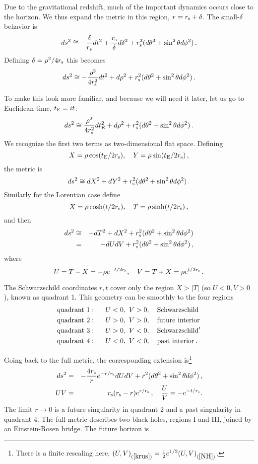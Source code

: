 \documentclass[12pt]{article}
\newcommand{\be}{\begin{equation}}
\newcommand{\ee}{\end{equation}}
\newcommand{\bea}{\begin{eqnarray}}
\newcommand{\eea}{\end{eqnarray}}
\newcommand{\rmx}{\rm}
\newcommand{\rs}{r_{\rmx s}}
\begin{document}
Due to the gravitational redshift, much of the important dynamics occurs close to the horizon.  We  thus expand the metric in this region, $r =  r_{\rmx s} + \delta$.
The small-$\delta$ behavior is
\be
ds^2 \cong - \frac{\delta}{ r_{\rmx s}} dt^2 + \frac{ r_{\rmx s}}{\delta} d\delta^2 +  r_{\rmx s}^2 (d\theta^2 + \sin^2\theta d\phi^2)\,.
\ee
Defining $\delta = \rho^2/4  r_{\rmx s}$ this becomes
\be
ds^2 \cong - \frac{\rho^2}{4 r_{\rmx s}^2} dt^2 +  d\rho^2 +  r_{\rmx s}^2 (d\theta^2 + \sin^2\theta d\phi^2)\,.
\ee

To make this look more familiar, and because we will need it later, let us go to Euclidean time, $t_{\rmx E} = it$:
\be
ds^2 \cong  \frac{\rho^2}{4 r_{\rmx s}^2} dt_{\rmx E}^2 +  d\rho^2 +  r_{\rmx s}^2 (d\theta^2 + \sin^2\theta d\phi^2)\,.
\ee
We recognize the first two terms as two-dimensional flat space.  Defining 
\be
X = \rho \cos (t_{\rmx E}/2r_{\rmx s}), \quad Y = \rho \sin (t_{\rmx E}/2r_{\rmx s})\,, \label{xy}
\ee
the metric is
\be
ds^2 \cong  dX^2 + dY^2 +  r_{\rmx s}^2 (d\theta^2 + \sin^2\theta d\phi^2)\,.
\ee
Similarly for the Lorentian case define 
\be
X = \rho \cosh (t/2r_{\rmx s}), \quad T = \rho \sinh (t/2r_{\rmx s})\,,
\ee
 and then
\bea
ds^2 &\cong&  -dT^2 + dX^2 +  r_{\rmx s}^2 (d\theta^2 + \sin^2\theta d\phi^2)  \nonumber\\
&=& -dU dV +  r_{\rmx s}^2 (d\theta^2 + \sin^2\theta d\phi^2)  
\,, \label{NH}
\eea
where 
\be
U = T-X = - \rho e^{-t/2r_{\rmx s}}, \quad V= T+X = \rho e^{t/2r_{\rmx s}} \label{uv}
\,.
\ee

The Schwarzschild coordinates $r,t$ cover only the region $X > |T|$ (so $U<0, V>0$), known as quadrant 1.  This geometry can be smoothly to the four regions
\bea
{\rm quadrant }\ 1:\ \ \  \ \  & U<0,\ V>0, \ \ \ {\rm Schwarzschild}  \nonumber\\
{\rm quadrant }\ 2:\ \ \  \ \  & U>0,\ V>0,  \ \ \ {\rm future\ interior} \nonumber\\
{\rm quadrant }\ 3:\ \ \  \ \  & U>0,\ V<0,  \ \ \ {\rm Schwarzschild'} \nonumber\\
{\rm quadrant }\ 4:\ \ \  \ \  & U<0,\ V<0,  \ \ \ {\rm past\ interior}\,.  \label{quad}
\eea

Going back to the full metric, the corresponding extension is\footnote{There is a finite rescaling here, $(U,V)_{(\ref{krus})} =  \frac12 e^{1/2} (U,V)_{(\ref{NH})}$. }
\bea
ds^2 &=& -\frac{4 r_{\rmx s}}{r} e^{-r/r_{\rmx s}} dU dV + r^2 (d\theta^2 + \sin^2\theta d\phi^2) \,, 
\nonumber\\
UV &=& \rs ( {r_{\rmx s}  - {r} }) e^{r/\rs} \,,\quad \frac{U}{V}= -e^{-t/r_{\rmx s}}. \label{krus}
\eea
The limit $r \to 0$ is a future singularity in quadrant 2 and a past singularity in quadrant 4.
The full metric describes two black holes, regions I and III, joined by an Einstein-Rosen bridge.
The future horizon is 
\end{document}
